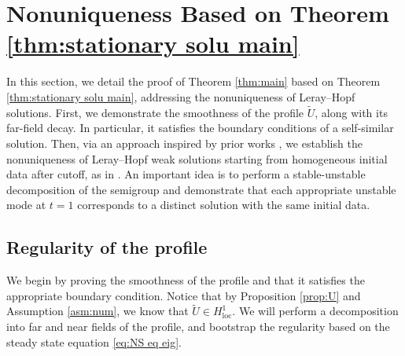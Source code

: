 \documentclass[11pt,a4paper]{article}
\numberwithin{equation}{section}
\newcommand{\tmop}[1]{\ensuremath{\operatorname{#1}}}
\begin{document}
\section{Nonuniqueness Based on Theorem \ref{thm:stationary solu main}}\label{sec:settt}
In this section, we detail the proof of Theorem \ref{thm:main} based on Theorem \ref{thm:stationary solu main}, addressing the
nonuniqueness of Leray--Hopf solutions. First, we demonstrate the smoothness
of the profile $\widetilde{U}$, along with its far-field decay. In particular, it satisfies the boundary conditions of a self-similar solution.  Then, via an approach inspired by prior works \cite{albritton2022non, jia2015incompressible}, we establish the nonuniqueness of Leray--Hopf weak solutions
starting from homogeneous initial data after cutoff, as in {\cite{jia2015incompressible}}. An important idea is to perform a stable-unstable decomposition of the semigroup and demonstrate that each appropriate unstable mode at $t=1$ corresponds to a distinct solution with the same initial data.

\subsection{Regularity of the profile}
\label{subsec2.1}
We begin by proving the smoothness of the profile and that it satisfies the appropriate boundary condition. Notice that by Proposition \ref{prop:U} and  Assumption \ref{asm:num}, we know that $\widetilde{U}\in H^1_{\tmop{loc}}$. We will perform a decomposition into far and near fields of the profile, and bootstrap the regularity based on the steady state equation \eqref{eq:NS eq eig}.  
\end{document}
